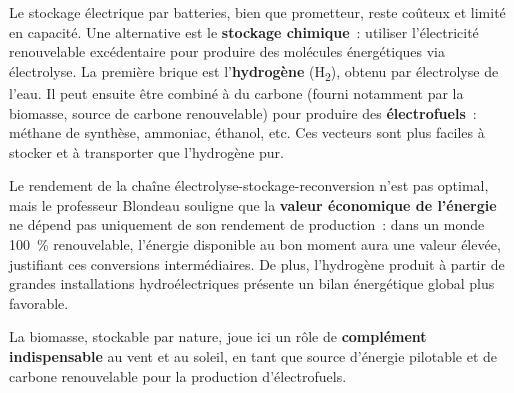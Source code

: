 Le stockage électrique par batteries, bien que prometteur, reste coûteux et limité en capacité. Une alternative est le \textbf{stockage chimique}~: utiliser l'électricité renouvelable excédentaire pour produire des molécules énergétiques via électrolyse. La première brique est l'\textbf{hydrogène} (H\textsubscript{2}), obtenu par électrolyse de l'eau. Il peut ensuite être combiné à du carbone (fourni notamment par la biomasse, source de carbone renouvelable) pour produire des \textbf{électrofuels}~: méthane de synthèse, ammoniac, éthanol, etc. Ces vecteurs sont plus faciles à stocker et à transporter que l'hydrogène pur.

Le rendement de la chaîne électrolyse-stockage-reconversion n'est pas optimal, mais le professeur Blondeau souligne que la \textbf{valeur économique de l'énergie} ne dépend pas uniquement de son rendement de production~: dans un monde 100~\% renouvelable, l'énergie disponible au bon moment aura une valeur élevée, justifiant ces conversions intermédiaires. De plus, l'hydrogène produit à partir de grandes installations hydroélectriques présente un bilan énergétique global plus favorable.

La biomasse, stockable par nature, joue ici un rôle de \textbf{complément indispensable} au vent et au soleil, en tant que source d'énergie pilotable et de carbone renouvelable pour la production d'électrofuels.